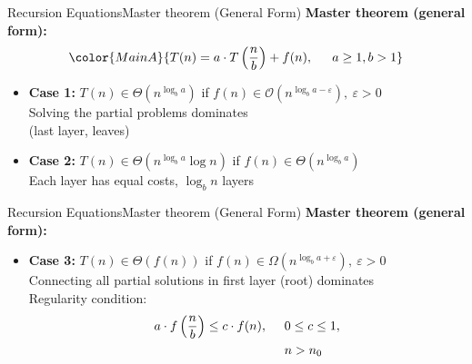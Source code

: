 \begin{frame}{Recursion Equations}{Master theorem (General Form)}
  \textbf{Master theorem (general form):}
  \begin{displaymath}
  \color{MainA}{%
    T(n) = a \cdot T\left(\frac{n}{b}\right) + f(n),%
    \hspace{1.5em}a \geq 1, b > 1%
  }%
  \end{displaymath}
  \vspace{-1.0em}
  \begin{itemize}
    \item<3->
      \textbf{Case 1:}
      {\color{MainB}$T(n) \in \Theta(n^{\log_b a})$}
      \hfill if {\color{MainA}
        $f(n) \in \mathcal{O}(n^{\log_b a-\varepsilon}), ~ \varepsilon > 0$
      }\\
      {\color{gray}Solving the partial problems dominates\\
        (last layer, leaves)}
      \vspace{1.5em}
    \item<4->
      \textbf{Case 2:}
      {\color{MainB}$T(n) \in \Theta(n^{\log_b a} \log n)$}
      \hspace{1.5em} if {\color{MainA}
        $f(n) \in \Theta(n^{\log_b a})$
      }\\
      {\color{gray}Each layer has equal costs, $\log_b n$ layers}
  \end{itemize}
\end{frame}


\begin{frame}{Recursion Equations}{Master theorem (General Form)}
  \textbf{Master theorem (general form):}
  \begin{itemize}
    \item
      \textbf{Case 3:}
      {\color{MainB}$T(n) \in \Theta(f(n))$}
      \hfill if {\color{MainA}
        $f(n) \in \Omega(n^{\log_b a+\varepsilon}), ~ \varepsilon > 0$
      }\\
      {\color{gray}Connecting all partial solutions in first layer (root) dominates}\\[1.0em]
      {\color{MainA}Regularity condition:}
      \begin{align*}
        a \cdot f\left(\frac{n}{b}\right) \leq c \cdot f(n), \hspace{1.5em} &
        0 \leq c \leq 1,\\
        {} & n > n_0
      \end{align*}
  \end{itemize}
\end{frame}

